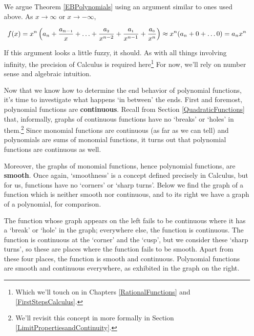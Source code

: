 \documentclass{ximera}
\begin{document}
\medskip


We argue Theorem \ref{EBPolynomials} using an argument similar to ones used above.  As $x \rightarrow \infty$ or $x \rightarrow -\infty$, 

\[ f(x) =  x^{n} \left( a_{n} +\dfrac{a_{n-\mbox{\tiny$1$}}}{x}+ \ldots + \dfrac{a_{\mbox{\tiny$2$}}}{x^{n-2}} + \dfrac{a_{\mbox{\tiny$1$}}}{x^{n-1}}+\dfrac{a_{\mbox{\tiny$0$}}}{x^{n}}\right) \approx x^n( a_{n} + 0 +\ldots 0) = a_{n} x^n \]

If this argument looks a little fuzzy, it should.  As with all things involving infinity, the precision of Calculus is required here\footnote{Which we'll touch on in Chapters \ref{RationalFunctions} and \ref{FirstStepsCalculus}.}  For now, we'll rely on number sense and algebraic intuition.

\medskip

Now that we know how to determine the end behavior of polynomial functions,  it's time to investigate what happens `in between' the ends.  First and foremost, polynomial functions are  \textbf{continuous}.  Recall from Section \ref{QuadraticFunctions} that, informally, graphs of continuous functions have no `breaks' or `holes' in them.\footnote{We'll revisit this concept in more formally in  Section \ref{LimitPropertiesandContinuity}.}   Since monomial functions are continuous (as far as we can tell) and polynomials are sums of monomial functions, it turns out that polynomial functions are continuous as well.  
 
\medskip

Moreover, the graphs of monomial functions, hence polynomial functions, are  \textbf{smooth}.  Once again, `smoothness' is a concept defined precisely in Calculus, but for us,  functions have no `corners' or `sharp turns'.  Below we find the graph of a function which is neither smooth nor continuous, and to its right we have a graph of a polynomial, for comparison.  

\medskip

The function whose graph appears on the left fails to be continuous where it has a `break' or `hole' in the graph;  everywhere else, the function is continuous.  The function is continuous at the `corner' and the `cusp', but we consider these `sharp turns', so these are places where the function fails to be smooth.  Apart from these four places, the function is smooth and continuous.  Polynomial functions are smooth and continuous everywhere, as exhibited in the graph on the right.  
\end{document}
